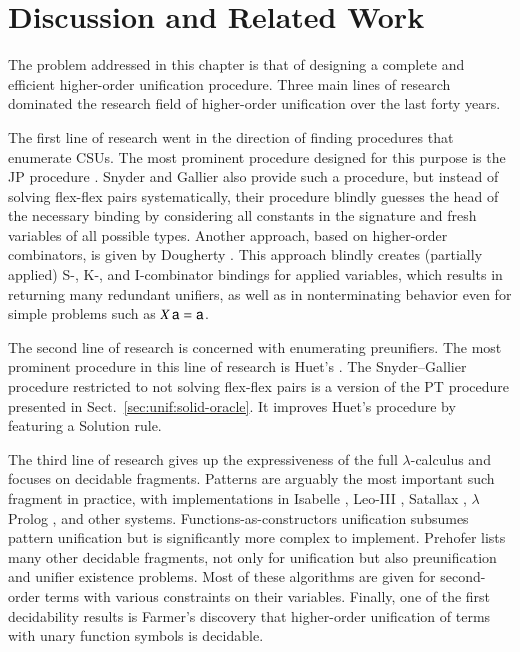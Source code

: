 \section{Discussion and Related Work}
The problem addressed in this chapter is that of designing
a complete and efficient higher-order unification procedure. Three main lines of
research dominated the research field of higher-order unification over the last forty years. 

The first line of research went in the direction of finding procedures that
enumerate CSUs. The most prominent procedure designed for
this purpose is the JP procedure \cite{jp-76-unif}. Snyder and Gallier
\cite{sg-89-unif} also provide such a procedure,
but instead of solving
flex-flex pairs systematically, their procedure blindly guesses the head of the necessary
binding by considering all constants in the signature and fresh variables of all
possible types. Another approach, based on higher-order combinators, is given by
Dougherty \cite{dd-93-comb-unif}. This approach blindly creates (partially
applied) \textsf{S}-, \textsf{K}-, and \textsf{I}-combinator bindings for applied
variables, which results in returning many redundant unifiers, as well as in
nonterminating behavior even for simple problems such as $X \, \mathsf{a} =
\mathsf{a}$.

The second line of research is concerned with enumerating
preunifiers. The most prominent procedure in this line of research is Huet's 
\cite{gh-75-unification}. The Snyder--Gallier procedure restricted to not solving flex-flex pairs
is a version of the PT procedure presented in Sect.~\ref{sec:unif:solid-oracle}. It improves 
Huet's procedure by featuring a \textsf{Solution} rule.

The third line of research gives up the expressiveness of the full
$\lambda$-calculus and focuses on decidable fragments. Patterns
\cite{tn-93-patterns} are arguably the most important such fragment in practice,
with implementations
in Isabelle \cite{tn-02-isabelle}, Leo-III \cite{sb-21-leo3}, Satallax
\cite{cb-12-satallax}, $\lambda$Prolog \cite{dm-12-lprolog}, and other systems.
Functions-as-constructors \cite{tl-16-facunif} unification subsumes pattern
unification but is significantly more complex to implement. Prehofer
\cite{cp-95-unifphd} lists many other decidable fragments, not only for
unification but also preunification and unifier existence problems. Most of
these algorithms are given for second-order terms with various constraints on
their variables. Finally, one of the first decidability results is Farmer's discovery \cite{wf-88-monadicunif} that
higher-order unification of terms with unary function symbols is decidable.

